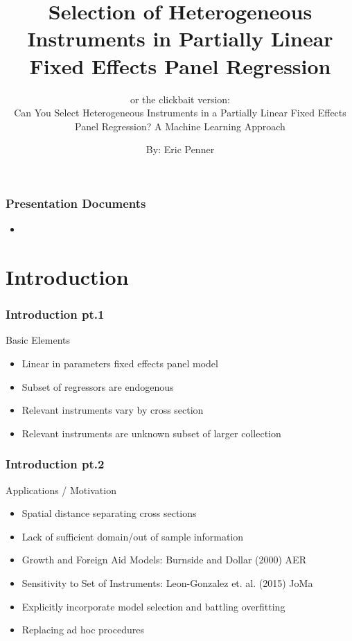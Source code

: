 \documentclass[9pt]{beamer}
\title{Selection of Heterogeneous Instruments in Partially Linear Fixed Effects Panel Regression }
\subtitle{ or the clickbait version: \\ Can You Select Heterogeneous Instruments in a Partially Linear Fixed Effects Panel Regression? A Machine Learning Approach  }
\author{By: Eric Penner}
\begin{document}
\begin{frame} 
\frametitle{Presentation Documents} 

\begin{itemize} 
	\item 
\end{itemize} 

\end{frame}



\frame{\titlepage}

\section{Introduction}
\begin{frame} 
\frametitle{Introduction pt.1} 

Basic Elements
\begin{itemize} \addtolength{\itemsep}{\baselineskip}
    \item Linear in parameters fixed effects panel model
    \item Subset of regressors are endogenous
    \item Relevant instruments vary by cross section 
    \item Relevant instruments are unknown subset of larger collection
\end{itemize}
 
\end{frame}
\begin{frame} 
\frametitle{Introduction pt.2} 


Applications / Motivation
\begin{itemize}\addtolength{\itemsep}{\baselineskip}
    \item Spatial distance separating cross sections 
    \item Lack of sufficient domain/out of sample information
    \item Growth and Foreign Aid Models: Burnside and Dollar (2000) AER  
    \item Sensitivity to Set of Instruments:    Leon-Gonzalez et. al. (2015) JoMa
    \item Explicitly incorporate model selection and battling overfitting
    \item Replacing ad hoc procedures
\end{itemize}


\end{frame}
\end{document}

